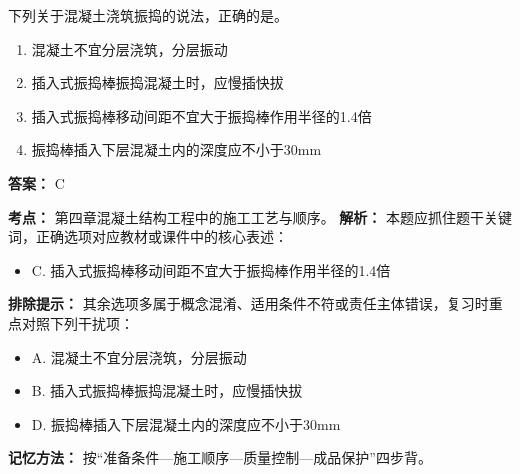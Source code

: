\documentclass[UTF8,fontset=fandol,11pt]{ctexart}
\begin{document}
\begin{quizbox}[title={第 74 题}]
下列关于混凝土浇筑振捣的说法，正确的是。\\
\begin{enumerate}[label=\Alph*.]
\item 混凝土不宜分层浇筑，分层振动
\item 插入式振捣棒振捣混凝土时，应慢插快拔
\item 插入式振捣棒移动间距不宜大于振捣棒作用半径的1.4倍
\item 振捣棒插入下层混凝土内的深度应不小于30mm
\end{enumerate}
\textbf{答案：} C
\vspace{0.25em}
\begin{answerbox}[title={考点解析}]
\textbf{考点：} 第四章混凝土结构工程中的施工工艺与顺序。
\textbf{解析：} 本题应抓住题干关键词，正确选项对应教材或课件中的核心表述：
\begin{itemize}
\item C. 插入式振捣棒移动间距不宜大于振捣棒作用半径的1.4倍
\end{itemize}
\textbf{排除提示：} 其余选项多属于概念混淆、适用条件不符或责任主体错误，复习时重点对照下列干扰项：
\begin{itemize}
\item A. 混凝土不宜分层浇筑，分层振动
\item B. 插入式振捣棒振捣混凝土时，应慢插快拔
\item D. 振捣棒插入下层混凝土内的深度应不小于30mm
\end{itemize}
\textbf{记忆方法：} 按“准备条件—施工顺序—质量控制—成品保护”四步背。
\end{answerbox}
\end{quizbox}

\vspace{0.2em}
\end{document}
